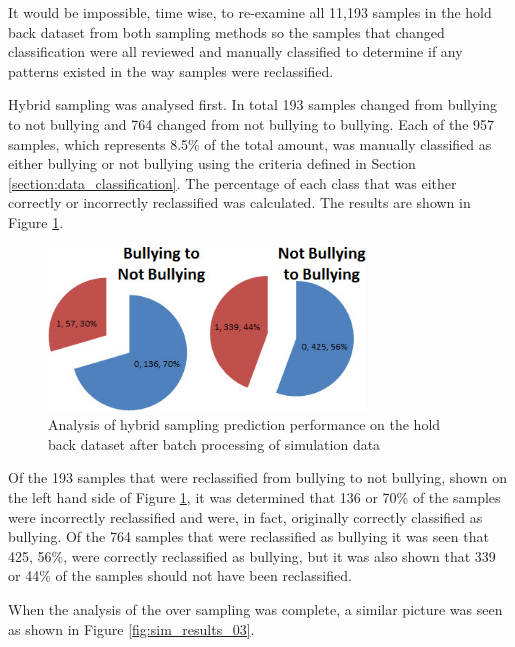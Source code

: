 It would be impossible, time wise, to re-examine all 11,193 samples in the hold back dataset from both sampling methods so the samples that changed classification were all reviewed and manually classified to determine if any patterns existed in the way samples were reclassified.

Hybrid sampling was analysed first. In total 193 samples changed from bullying to not bullying and 764 changed from not bullying to bullying. Each of the 957 samples, which represents 8.5\% of the total amount, was manually classified as either bullying or not bullying using the criteria defined in Section \ref{section:data_classification}. The percentage of each class that was either correctly or incorrectly reclassified was calculated. The results are shown in Figure \ref{fig:sim_results_02}.

\begin{figure}[htbp]
	\centering
	\includegraphics[width=0.75\textwidth]{Figures/Chapter5/sim_results_02.jpg}
	\caption[Analysis of Hybrid Sampling on Hold Back Dataset]{Analysis of hybrid sampling prediction performance on the hold back dataset after batch processing of simulation data}
	\label{fig:sim_results_02}
\end{figure}

Of the 193 samples that were reclassified from bullying to not bullying, shown on the left hand side of Figure \ref{fig:sim_results_02}, it was determined that 136 or 70\% of the samples were incorrectly reclassified and were, in fact, originally correctly classified as bullying. Of the 764 samples that were reclassified as bullying it was seen that 425, 56\%, were correctly reclassified as bullying, but it was also shown that 339 or 44\% of the samples should not have been reclassified.

When the analysis of the over sampling was complete, a similar picture was seen as shown in Figure \ref{fig:sim_results_03}.

